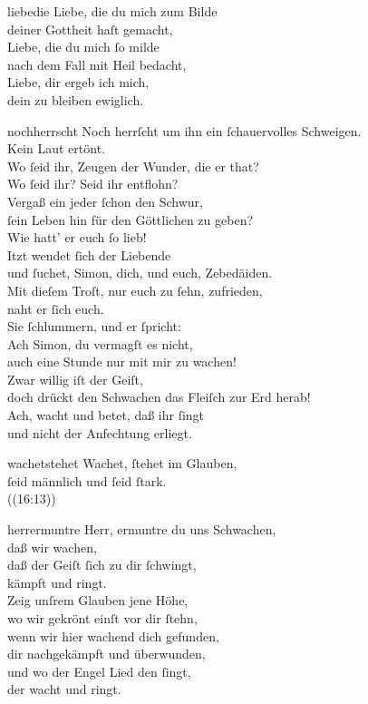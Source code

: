 \documentclass[shorttitlesize=55,tocstyle=ref-genre]{ees}
\begin{document}
{\begin{movement}{liebedie}
  \voice[Coro]
  Liebe, die du mich zum Bilde\\
  deiner Gottheit haſt gemacht,\\
  Liebe, die du mich ſo milde\\
  nach dem Fall mit Heil bedacht,\\
  Liebe, dir ergeb ich mich,\\
  dein zu bleiben ewiglich.
\end{movement}

\begin{movement}{nochherrscht}
  \voice[Tenore]
  Noch herrſcht um ihn ein ſchauervolles Schweigen.\\
  Kein Laut ertönt.\\
  Wo ſeid ihr, Zeugen der Wunder, die er that?\\
  Wo ſeid ihr? Seid ihr entflohn?\\
  Vergaß ein jeder ſchon den Schwur,\\
  ſein Leben hin für den Göttlichen zu geben?\\
  Wie hatt’ er euch ſo lieb!\\
  Itzt wendet ſich der Liebende\\
  und ſuchet, Simon, dich, und euch, Zebedäiden.\\
  Mit dieſem Troſt, nur euch zu ſehn, zufrieden,\\
  naht er ſich euch.\\
  Sie ſchlummern, und er ſpricht:\\
  Ach Simon, du vermagſt es nicht,\\
  auch eine Stunde nur mit mir zu wachen!\\
  Zwar willig iſt der Geiſt,\\
  doch drückt den Schwachen das Fleiſch zur Erd herab!\\
  Ach, wacht und betet, daß ihr ſingt\\
  und nicht der Anfechtung erliegt.
\end{movement}

\begin{movement}{wachetstehet}
  \voice[Coro]
  Wachet, ſtehet im Glauben,\\
  ſeid männlich und ſeid ſtark.\\
  ((16:13))
\end{movement}

\begin{movement}{herrermuntre}
  \voice[Tenore]
  Herr, ermuntre du uns Schwachen,\\
  daß wir wachen,\\
  daß der Geiſt ſich zu dir ſchwingt,\\
  kämpft und ringt.\\
  Zeig unſrem Glauben jene Höhe,\\
  wo wir gekrönt einſt vor dir ſtehn,\\
  wenn wir hier wachend dich gefunden,\\
  dir nachgekämpft und überwunden,\\
  und wo der Engel Lied den ſingt,\\
  der wacht und ringt.
\end{movement}

}
\end{document}
